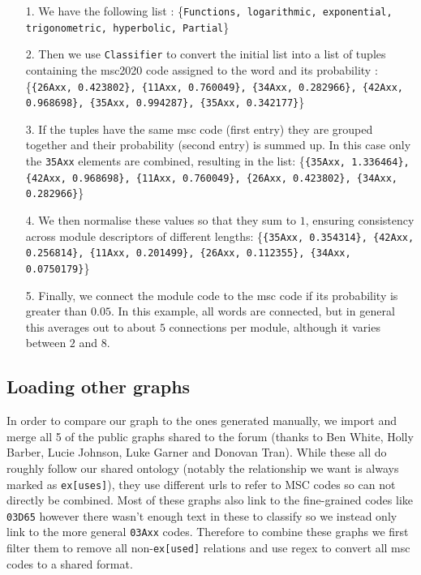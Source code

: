 \documentclass[english, 12pt]{article}
\begin{document}
\begin{itemize}
\item[1.] We have the following list : 
\{\texttt{Functions, logarithmic, exponential, trigonometric, hyperbolic, Partial}\}
\item[2.] Then we use \texttt{Classifier} to convert the initial list into a list of tuples containing the msc2020 code assigned to the word and its probability : 
\{\texttt{\{26Axx, 0.423802\}, \{11Axx, 0.760049\}, \{34Axx, 0.282966\}, \{42Axx, 0.968698\}, \{35Axx, 0.994287\}, \{35Axx, 0.342177\}}\}
\item[3.] If the tuples have the same msc code (first entry) they are grouped together and their probability (second entry) is summed up. In this case only the \texttt{35Axx} elements are combined, resulting in the list: \{\texttt{\{35Axx, 1.336464\}, \{42Axx, 0.968698\}, \{11Axx, 0.760049\}, \{26Axx, 0.423802\}, \{34Axx, 0.282966\}}\}
	\item[4.] We then normalise these values so that they sum to $1$, ensuring consistency across module descriptors of different lengths: \{\texttt{\{35Axx, 0.354314\}, \{42Axx, 0.256814\}, \{11Axx, 0.201499\}, \{26Axx, 0.112355\}, \{34Axx, 0.0750179\}}\}
   	\item[5.] Finally, we connect the module code to the msc code if its probability is greater than $0.05$. In this example, all words are connected, but in general this averages out to about $5$ connections per module, although it varies between $2$ and $8$. 
\end{itemize}

\subsection{Loading other graphs}
In order to compare our graph to the ones generated manually, we import and merge all 5 of the public graphs shared to the forum (thanks to Ben White, Holly Barber, Lucie Johnson, Luke Garner and Donovan Tran). While these all do roughly follow our shared ontology (notably the relationship we want is always marked as \texttt{ex[uses]}), they use different urls to refer to MSC codes so can not directly be combined. Most of these graphs also link to the fine-grained codes like \texttt{03D65} however there wasn't enough text in these to classify so we instead only link to the more general \texttt{03Axx} codes. Therefore to combine these graphs we first filter them to remove all non-\texttt{ex[used]} relations and use regex to convert all msc codes to a shared format.
\end{document}
